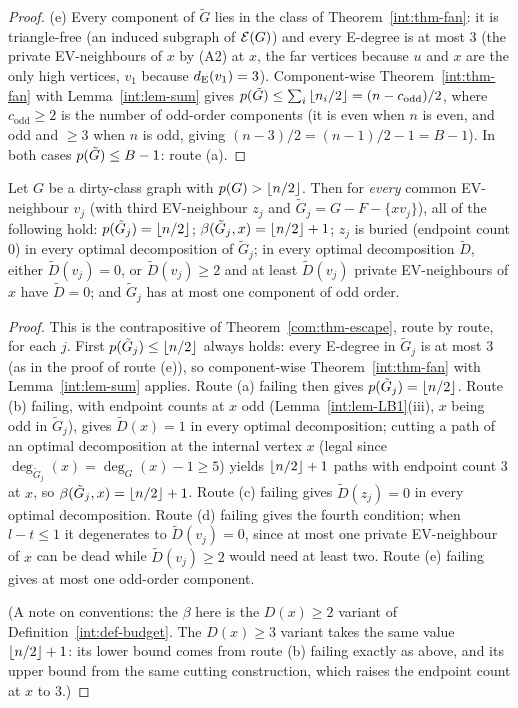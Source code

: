 \begin{proof}
(e) Every component of $\tilde G$ lies in the class of
Theorem~\ref{int:thm-fan}: it is triangle-free (an induced subgraph of
$\mathcal{E}(G)$) and every E-degree is at most $3$ (the private EV-neighbours of
$x$ by (A2) at $x$, the far vertices because $u$ and $x$ are the only
high vertices, $v_1$ because $d_{\mathrm{E}}(v_1)=3$). Component-wise
Theorem~\ref{int:thm-fan} with Lemma~\ref{int:lem-sum} gives
$p(\tilde G)\le\sum_i\left\lfloor n_i/2 \right\rfloor=(n-c_{\mathrm{odd}})/2$, where
$c_{\mathrm{odd}}\ge2$ is the number of odd-order components (it is even
when $n$ is even, and odd and $\ge3$ when $n$ is odd, giving
$(n-3)/2=(n-1)/2-1=B-1$). In both cases $p(\tilde G)\le B-1$: route
(a).
\end{proof}

\begin{corollary}\label{com:cor-corner}
Let $G$ be a dirty-class graph with $p(G)>\left\lfloor n/2 \right\rfloor$. Then for
\emph{every} common EV-neighbour $v_j$ (with third EV-neighbour $z_j$ and
$\tilde G_j=G-F-\{xv_j\}$), all of the following hold:
$p(\tilde G_j)=\left\lfloor n/2 \right\rfloor$; $\beta(\tilde G_j,x)=\left\lfloor n/2 \right\rfloor+1$; $z_j$
is buried (endpoint count $0$) in every optimal decomposition of
$\tilde G_j$; in every optimal decomposition $\tilde D$, either
$\tilde D(v_j)=0$, or $\tilde D(v_j)\ge2$ and at least $\tilde D(v_j)$
private EV-neighbours of $x$ have $\tilde D=0$; and $\tilde G_j$ has at
most one component of odd order.
\end{corollary}

\begin{proof}
This is the contrapositive of Theorem~\ref{com:thm-escape}, route by
route, for each $j$. First $p(\tilde G_j)\le\left\lfloor n/2 \right\rfloor$ always holds:
every E-degree in $\tilde G_j$ is at most $3$ (as in the proof of route
(e)), so component-wise Theorem~\ref{int:thm-fan} with
Lemma~\ref{int:lem-sum} applies. Route (a) failing then gives
$p(\tilde G_j)=\left\lfloor n/2 \right\rfloor$. Route (b) failing, with endpoint counts at
$x$ odd (Lemma~\ref{int:lem-LB1}(iii), $x$ being odd in $\tilde G_j$),
gives $\tilde D(x)=1$ in every optimal decomposition; cutting a path of
an optimal decomposition at the internal vertex $x$ (legal since
$\deg_{\tilde G_j}(x)=\deg_G(x)-1\ge5$) yields $\left\lfloor n/2 \right\rfloor+1$ paths with
endpoint count $3$ at $x$, so $\beta(\tilde G_j,x)=\left\lfloor n/2 \right\rfloor+1$. Route
(c) failing gives $\tilde D(z_j)=0$ in every optimal decomposition.
Route (d) failing gives the fourth condition; when $l-t\le1$ it
degenerates to $\tilde D(v_j)=0$, since at most one private EV-neighbour
of $x$ can be dead while $\tilde D(v_j)\ge2$ would need at least two.
Route (e) failing gives at most one odd-order component.

(A note on conventions: the $\beta$ here is the $D(x)\ge2$ variant of
Definition~\ref{int:def-budget}. The $D(x)\ge3$ variant takes the same
value $\left\lfloor n/2 \right\rfloor+1$: its lower bound comes from route (b) failing
exactly as above, and its upper bound from the same cutting construction,
which raises the endpoint count at $x$ to $3$.)
\end{proof}

